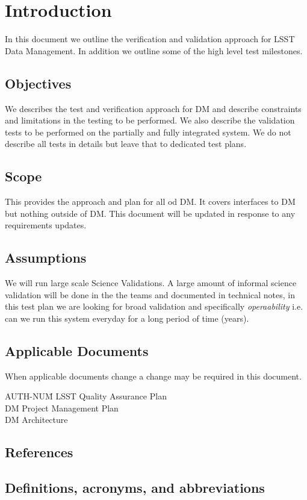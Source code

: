 
\section{Introduction \label{sect:intro}}
In this document  we outline the verification and validation approach for LSST Data Management. In addition we outline some of the high level test milestones. 


\subsection{Objectives \label{sect:objectives}}

We describes the test and verification approach for DM and describe  constraints and limitations in the testing to be performed. 
We also describe the validation tests to be performed on the partially and fully integrated system. 
We do not describe all tests in details but leave that to dedicated test plans.


\subsection{Scope \label{sect:scope}}

This provides the approach and plan for all od DM. It covers interfaces to DM but nothing outside of DM. 
This document will be updated in response to any  requirements updates.

\subsection{Assumptions}  
 We will run large scale Science Validations. A large amount of informal science validation will be done in the the teams and documented in technical notes, in this test plan we are looking for broad validation and specifically {\em operaability} i.e. can we run this system everyday for a long period of time (years).

\subsection{Applicable Documents \label{sect:ad}}
When applicable documents change a change may be required in this document.
\begin{tabbing}
AUTH-NUM\= \kill 
{}\>	LSST Quality  Assurance Plan \\
 \>	DM Project Management Plan   \\
\>	DM Architecture\\
\end{tabbing}

\subsection{References}

\renewcommand{\refname}{}


\subsection{Definitions, acronyms, and abbreviations \label{sect:acronyms}} 





